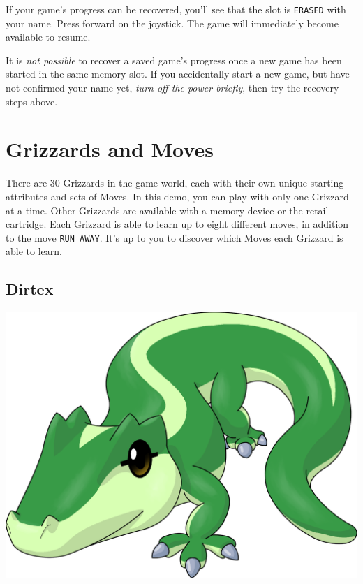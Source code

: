 \documentclass[10pt,twocolumn,openany,article]{memoir}
\begin{document}
If your  game's progress can be  recovered, you'll see that  the slot is
\texttt{ERASED} with your name. Press  forward on the joystick. The game
will immediately become available to resume.

It is \emph{not possible} to recover  a saved game's progress once a new
game has been started in the same memory slot. If you accidentally start
a new  game, but have  not confirmed your  name yet, \emph{turn  off the
  power briefly}, then try the recovery steps above.

\fi

\fi %

\ifdefined\ATARIAGESAVE
\vfill
\fi

\chapter{Grizzards and Moves}\label{ch:Grizzards}

There are  30 Grizzards in  the game world,  each with their  own unique
starting attributes and  sets of Moves. \ifdefined\NOSAVE  In this demo,
you  can play  with only  one Grizzard  at a  time. Other  Grizzards are
available  with  a memory  device  or  the  retail cartridge.  \fi  Each
Grizzard is able  to learn up to  eight different moves, in  addition to the
move \texttt{RUN  AWAY}. It's  up to  you to  discover which  Moves each
Grizzard is able to learn.

\ifdefined\ATARIAGESAVE
\vfill
\fi

\ifdefined\DEMO\else

\pagebreak

\section{Dirtex}

\begin{center}
  \includegraphics[width=\columnwidth]{../Manual/Dirtex.png}
\end{center}
\end{document}
